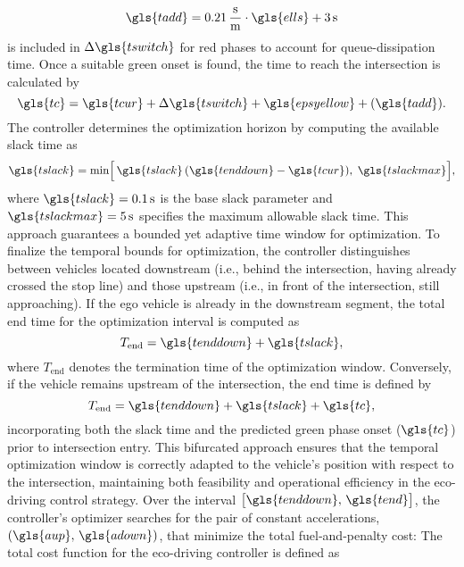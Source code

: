 \begin{equation}
    \gls{tadd}
    = 0.21\,\frac{\mathrm{s}}{\mathrm{m}} \cdot \gls{ells} + 3\,\mathrm{s}
\end{equation}
is included in $\Delta \gls{tswitch}$ for red phases to account for queue-dissipation time. Once a suitable green onset is found, the time to reach the intersection is calculated by
\begin{equation}
    \gls{tc}
    = \gls{tcur} + \Delta\gls{tswitch} + \gls{epsyellow} + (\gls{tadd}).
\end{equation}
The controller determines the optimization horizon by computing the available slack time as
\begin{equation}
    \gls{tslack} = \min\Bigl[\, \gls{tslack}\,(\gls{tenddown} - \gls{tcur}),\; \gls{tslackmax} \Bigr],
\end{equation}
where $\gls{tslack}=0.1\,\mathrm{s}$ is the base slack parameter and $\gls{tslackmax}=5\,\mathrm{s}$ specifies the maximum allowable slack time. This approach guarantees a bounded yet adaptive time window for optimization.
To finalize the temporal bounds for optimization, the controller distinguishes between vehicles located downstream (i.e., behind the intersection, having already crossed the stop line) and those upstream (i.e., in front of the intersection, still approaching). If the ego vehicle is already in the downstream segment, the total end time for the optimization interval is computed as
\begin{equation}
    T_{\mathrm{end}} = \gls{tenddown} + \gls{tslack},
\end{equation}
where $T_{\mathrm{end}}$ denotes the termination time of the optimization window. Conversely, if the vehicle remains upstream of the intersection, the end time is defined by
\begin{equation}
    T_{\mathrm{end}} = \gls{tenddown} + \gls{tslack} + \gls{tc},
\end{equation}
incorporating both the slack time and the predicted green phase onset ($\gls{tc}$) prior to intersection entry. This bifurcated approach ensures that the temporal optimization window is correctly adapted to the vehicle’s position with respect to the intersection, maintaining both feasibility and operational efficiency in the eco-driving control strategy.
\mynewline
Over the interval $\bigl[\gls{tenddown},\,\gls{tend}\bigr]$, the controller’s optimizer searches for the pair of constant accelerations, $(\gls{aup},\,\gls{adown})$, that minimize the total fuel‐and‐penalty cost:
The total cost function for the eco-driving controller is defined as
